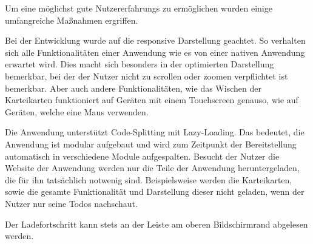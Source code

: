 











Um eine möglichst gute Nutzererfahrungs zu ermöglichen wurden einige umfangreiche Maßnahmen ergriffen.



Bei der Entwicklung wurde auf die responsive Darstellung geachtet.
So verhalten sich alle Funktionalitäten einer Anwendung wie es von einer nativen Anwendung erwartet wird.
Dies macht sich besonders in der optimierten Darstellung bemerkbar, bei der der Nutzer nicht zu scrollen oder zoomen verpflichtet ist bemerkbar.
Aber auch andere Funktionalitäten, wie das Wischen der Karteikarten funktioniert auf Geräten mit einem Touchscreen genauso, wie auf Geräten, welche eine Maus verwenden. 


Die Anwendung unterstützt Code-Splitting mit Lazy-Loading.
Das bedeutet, die Anwendung ist modular aufgebaut und wird zum Zeitpunkt der Bereitstellung automatisch in verschiedene Module aufgespalten.
Besucht der Nutzer die Website der Anwendung werden nur die Teile der Anwendung heruntergeladen, die für ihn tatsächlich notwenig sind.
Beispielsweise werden die Karteikarten, sowie die gesamte Funktionalität und Darstellung dieser nicht geladen, wenn der Nutzer nur seine Todos nachschaut.






Der Ladefortschritt kann stets an der Leiste am oberen Bildschirmrand abgelesen werden.

